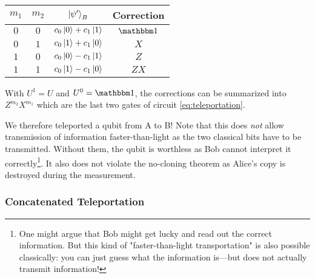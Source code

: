 			\begin{center}
				\centering
				\begin{tabular}{cc|c|c}
					\(m_1\) & \(m_2\) &        \(\ket{\psi'}_B\)        & Correction \\ \midrule
					 \(0\)  &  \(0\)  & \( c_0 \ket{0} + c_1 \ket{1} \) &  \(\ID\)   \\
					 \(0\)  &  \(1\)  & \( c_0 \ket{1} + c_1 \ket{0} \) &   \(X\)    \\
					 \(1\)  &  \(0\)  & \( c_0 \ket{0} - c_1 \ket{1} \) &   \(Z\)    \\
					 \(1\)  &  \(1\)  & \( c_0 \ket{1} - c_1 \ket{0} \) &   \(ZX\)
				\end{tabular}
			\end{center}
			With \( U^1 = U \) and \( U^0 = \ID \), the corrections can be summarized into \( Z^{m_2} X^{m_1} \) which are the last two gates of circuit \eqref{eq:teleportation}.

			We therefore teleported a qubit from A to B! Note that this does \emph{not} allow transmission of information faster-than-light as the two classical bits have to be transmitted. Without them, the qubit is worthless as Bob cannot interpret it correctly\footnote{One might argue that Bob might get lucky and read out the correct information. But this kind of "faster-than-light transportation" is also possible classically: you can just guess what the information is---but does not actually transmit information!}. It also does not violate the no-cloning theorem as Alice's copy is destroyed during the measurement.

			\subsubsection{Concatenated Teleportation}


